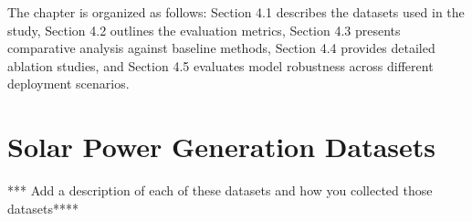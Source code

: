 \documentclass[12pt]{uomthesis}
\begin{document}
The chapter is organized as follows: Section 4.1 describes the datasets used in the study, Section 4.2 outlines the evaluation metrics, Section 4.3 presents comparative analysis against baseline methods, Section 4.4 provides detailed ablation studies, and Section 4.5 evaluates model robustness across different deployment scenarios.
\section{Solar Power Generation Datasets}


*** Add a description of each of these datasets and how you collected those datasets****
\end{document}
